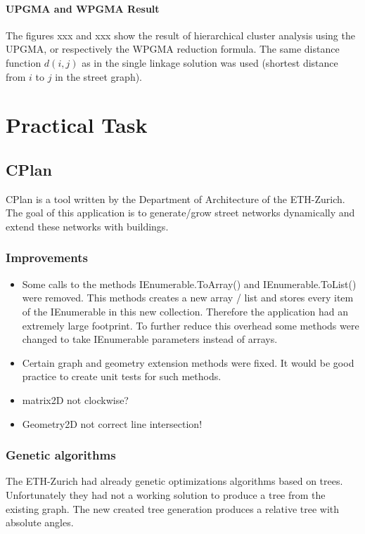 \documentclass[11pt, a4paper]{report}
\begin{document}
\subsubsection{UPGMA and WPGMA Result}
The figures xxx and xxx show the result of hierarchical cluster analysis using the UPGMA, or respectively the WPGMA reduction formula. The same distance function $d(i, j)$ as in the single linkage solution was used (shortest distance from $i$ to $j$ in the street graph).

\pagebreak
\chapter{Practical Task}
\section{CPlan}\label{CPlan}
CPlan is a tool written by the Department of Architecture of the ETH-Zurich. The goal of this application is to generate/grow street networks dynamically and extend these networks with buildings. 
\subsection{Improvements}
\begin{itemize}
    \item Some calls to the methods IEnumerable.ToArray() and IEnumerable.ToList() were removed. This methods creates a new array / list and stores every item of the IEnumerable in this new collection. Therefore the application had an extremely large footprint. To further reduce this overhead some methods were changed to take IEnumerable parameters instead of arrays.
    \item Certain graph and geometry extension methods were fixed. It would be good practice to create unit tests for such methods.
    \item matrix2D not clockwise?
    \item Geometry2D not correct line intersection!
\end{itemize}

\subsection{Genetic algorithms}
The ETH-Zurich had already genetic optimizations algorithms based on trees. Unfortunately they had not a working solution to produce a tree from the existing graph. The new created tree generation produces a relative tree with absolute angles.
\end{document}
